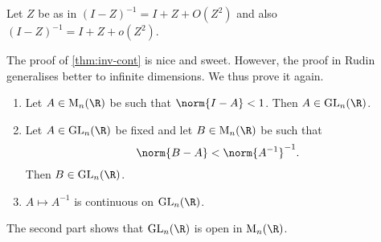 
\begin{exercise}
    Let $Z$ be as in 
    $(I - Z)^{-1} = I + Z + O(Z^2)$ and also
    $(I - Z)^{-1} = I + Z + o(Z^2)$.
\end{exercise}

The proof of \cref{thm:inv-cont} is nice and sweet.
However, the proof in Rudin generalises better to infinite dimensions.
We thus prove it again.
\begin{theorem*} \label{thm:inv-cont-rudin} \leavevmode
    \begin{enumerate}
        \item Let $A \in \M_n(\R)$ be such that $\norm{I - A} < 1$.
        Then $A \in \GL_n(\R)$.
        \item Let $A \in \GL_n(\R)$ be fixed and let
        $B \in \M_n(\R)$ be such that \[
            \norm{B - A} < \norm{A^{-1}}^{-1}.
        \] Then $B \in \GL_n(\R)$.
        \item $A \mapsto A^{-1}$ is continuous on $\GL_n(\R)$.
    \end{enumerate}
\end{theorem*}
\begin{remark}
    The second part shows that $\GL_n(\R)$ is open in $\M_n(\R)$.
\end{remark}
